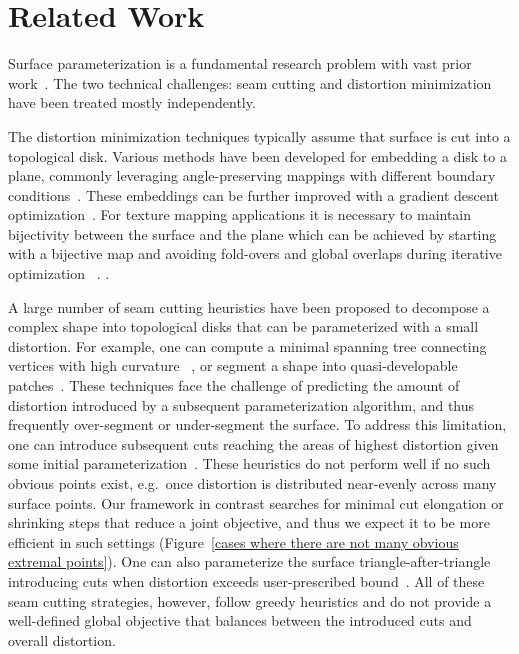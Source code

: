 
\section{Related Work}
Surface parameterization is a fundamental research problem with vast prior work~\cite{Hormann2008}. 
The two technical challenges: seam cutting and distortion minimization have been treated mostly independently. 

The distortion minimization techniques typically assume that surface is cut into a topological disk. Various methods
have been developed for embedding a disk to a plane, commonly leveraging angle-preserving mappings with different
boundary conditions~\cite{Floater2003,Sheffer2005ABFPP,Levy2002,Aigerman2015,Sawhney:2017}. 
These embeddings can be further improved with a gradient descent optimization~\cite{Hormann2000MIPS,Rabinovich2017,Zhu2017BCQN,Shtengel:GOvCM:2017}. 
For texture mapping applications it is necessary to maintain bijectivity between the surface and the plane 
which can be achieved by starting with a bijective map and avoiding fold-overs and global overlaps during iterative optimization ~\cite{Smith2015Bijective,Jiang2017Simplicial}.
%
.

A large number of seam cutting heuristics have been proposed to decompose a complex shape into topological disks that can be
parameterized with a small distortion. For example, one can compute a minimal spanning tree connecting vertices with high curvature
~\cite{Sheffer2002Seamster}, or segment a shape into quasi-developable patches~\cite{Julius2005D}. These 
techniques face the challenge of predicting the amount of distortion introduced by a subsequent parameterization algorithm,
and thus frequently over-segment or under-segment the surface. 
%
To address this limitation, one can introduce subsequent cuts reaching the areas of highest distortion given some initial parameterization~\cite{Gu2002Geometry}.
%
These heuristics do not perform well if no such obvious points exist, e.g.\ once distortion is distributed near-evenly across many surface points. Our framework in contrast searches for minimal cut elongation or shrinking steps that reduce a joint objective, and thus we expect it to be more efficient in such settings (Figure~\ref{cases where there are not many obvious extremal points}).
%
One can also parameterize the surface triangle-after-triangle introducing cuts when distortion exceeds user-prescribed bound~\cite{BoundedDistortParam:2002}. 
%
All of these seam cutting strategies, however, follow greedy heuristics and do not provide a well-defined global objective that balances between the introduced cuts and overall distortion. 

